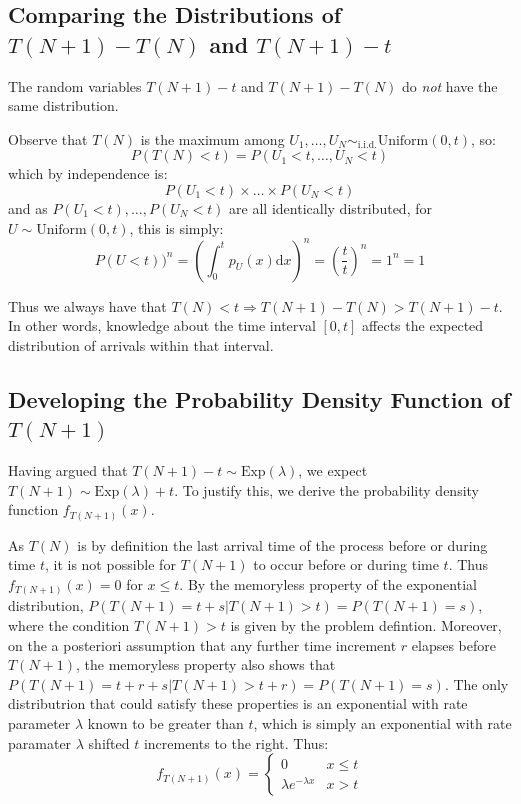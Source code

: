 \documentclass[11pt, oneside]{article}   	%
\begin{document}
\subsection{Comparing the Distributions of $T(N+1)-T(N)$ and $T(N+1)-t$}
The random variables $T(N + 1) - t$ and $T(N + 1) - T(N)$ do \emph{not} have the same distribution.

Observe that $T(N)$ is the maximum among $U_1, \dots, U_N \sim_{\text{i.i.d.}} \text{Uniform}(0, t)$, so:
$$P(T(N) < t) = P(U_1 < t, \dots, U_N < t)$$
which by independence is:
$$P(U_1 < t) \times \dots \times P(U_N < t)$$
and as $P(U_1 < t), \dots,  P(U_N < t)$ are all identically distributed, for $U \sim \text{Uniform}(0, t)$, this is simply:
$$P(U < t))^n = \left( \int_{0}^{t} p_U(x) \mathrm{d}x \right)^n = \left(\frac{t}{t}\right)^n = 1^n = 1$$

Thus we always have that $T(N) < t \Rightarrow T(N + 1) - T(N) > T(N + 1) - t$. In other words, knowledge about the time interval $[0,t]$ affects the expected distribution of arrivals within that interval.
\subsection{Developing the Probability Density Function of $T(N+1)$}
Having argued that $T(N + 1) - t \sim \text{Exp}(\lambda)$, we expect $T(N + 1) \sim \text{Exp}(\lambda) + t$. To justify this, we derive the probability density function $f_{T(N + 1)}(x)$.

As $T(N)$ is by definition the last arrival time of the process before or during time $t$, it is not possible for $T(N + 1)$ to occur before or during time $t$. Thus $f_{T(N + 1)}(x) = 0$ for $x \leq t$. By the memoryless property of the exponential distribution, $P(T(N + 1) = t + s | T(N + 1) > t) = P(T(N + 1) = s)$, where the condition $T(N + 1) > t$ is given by the problem defintion. Moreover, on the a posteriori assumption that any further time increment $r$ elapses before $T(N + 1)$, the memoryless property also shows that $P(T(N + 1) = t + r + s | T(N + 1) > t + r) = P(T(N + 1) = s)$. The only distributrion that could satisfy these properties is an exponential with rate parameter $\lambda$ known to be greater than $t$, which is simply an exponential with rate paramater $\lambda$ shifted $t$ increments to the right. Thus:
\[
f_{T(N + 1)}(x) =
\begin{cases} 
      0 & x \leq t \\
      \lambda e^{-\lambda x} & x > t 
   \end{cases}
\]
\end{document}
